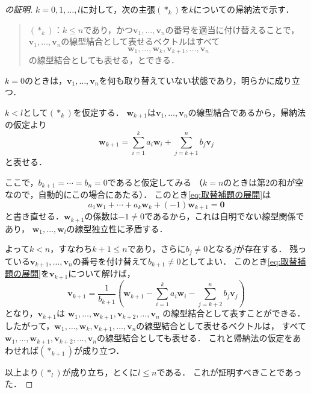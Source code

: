 \begin{tleftbar}
\begin{proof}[の証明]
  $k = 0, 1, \dots, l$に対して，次の主張$(\ast_k)$を$k$についての帰納法で示す．

  \begin{quote}
    $(\ast_k)$：$k \le n$であり，かつ$\bm{v}_1, \dots, \bm{v}_n$の番号を適当に付け替えることで，
    $\bm{v}_1, \dots, \bm{v}_n$の線型結合として表せるベクトルはすべて
    \[
      \bm{w}_1, \dots, \bm{w}_k, \bm{v}_{k+1}, \dots, \bm{v}_n
    \]
    の線型結合としても表せる，とできる．
  \end{quote}

  $k = 0$のときは，$\bm{v}_1, \dots, \bm{v}_n$を何も取り替えていない状態であり，明らかに成り立つ．

  $k < l$として$(\ast_k)$を仮定する．
  $\bm{w}_{k+1}$は$\bm{v}_1, \dots, \bm{v}_n$の線型結合であるから，帰納法の仮定より
  \begin{equation}
    \bm{w}_{k+1}
    = \sum_{i=1}^{k} a_i \bm{w}_i + \sum_{j=k+1}^{n} b_j \bm{v}_j
    \label{eq:取替補題の展開}
  \end{equation}
  と表せる．

  ここで，$b_{k+1} = \cdots = b_n = 0$であると仮定してみる
  （$k = n$のときは第$2$の和が空なので，自動的にこの場合にあたる）．
  このとき\eqref{eq:取替補題の展開}は
  \[
    a_1 \bm{w}_1 + \cdots + a_k \bm{w}_k + (-1)\bm{w}_{k+1} = \bm{0}
  \]
  と書き直せる．$\bm{w}_{k+1}$の係数は$-1 \ne 0$であるから，これは自明でない線型関係であり，
  $\bm{w}_1, \dots, \bm{w}_l$の線型独立性に矛盾する．

  よって$k < n$，すなわち$k + 1 \le n$であり，さらに$b_j \ne 0$となる$j$が存在する．
  残っている$\bm{v}_{k+1}, \dots, \bm{v}_n$の番号を付け替えて$b_{k+1} \ne 0$としてよい．
  このとき\eqref{eq:取替補題の展開}を$\bm{v}_{k+1}$について解けば，
  \[
    \bm{v}_{k+1}
    = \frac{1}{b_{k+1}}\left( \bm{w}_{k+1} - \sum_{i=1}^{k} a_i \bm{w}_i - \sum_{j=k+2}^{n} b_j \bm{v}_j \right)
  \]
  となり，$\bm{v}_{k+1}$は
  $\bm{w}_1, \dots, \bm{w}_{k+1}, \bm{v}_{k+2}, \dots, \bm{v}_n$
  の線型結合として表すことができる．
  したがって，$\bm{w}_1, \dots, \bm{w}_k, \bm{v}_{k+1}, \dots, \bm{v}_n$の線型結合として表せるベクトルは，
  すべて$\bm{w}_1, \dots, \bm{w}_{k+1}, \bm{v}_{k+2}, \dots, \bm{v}_n$の線型結合としても表せる．
  これと帰納法の仮定をあわせれば$(\ast_{k+1})$が成り立つ．

  以上より$(\ast_l)$が成り立ち，とくに$l \le n$である．
  これが証明すべきことであった．
\end{proof}
\end{tleftbar}

